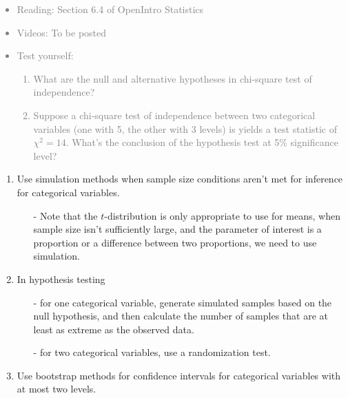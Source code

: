 \documentclass[11pt]{article}
\newcommand{\gray}[1]{\textcolor{gray}{#1}}
\begin{document}
\gray{
{\it
\vspace{-0.55cm}
\begin{itemize}
\renewcommand{\labelitemi}{{\textcolor{dark}{$\ast$}}}
\item Reading: Section 6.4 of OpenIntro Statistics
\item Videos: To be posted
\item Test yourself:
\begin{enumerate}
\item What are the null and alternative hypotheses in chi-square test of independence?
\item Suppose a chi-square test of independence between two categorical variables (one with 5, the other with 3 levels) is yields a test statistic of $\chi^2 = 14$. What's the conclusion of the hypothesis test at 5\% significance level?
\end{enumerate}
\end{itemize}
}}

%

\begin{enumerate}[resume]
\renewcommand\labelenumi{\textcolor{light}{\textbf{LO \theenumi.}}}

\item Use simulation methods when sample size conditions aren't met for inference for categorical variables.
\begin{itemize}
\item[-] Note that the $t$-distribution is only appropriate to use for means, when sample size isn't sufficiently large, and the parameter of interest is a proportion or a difference between two proportions, we need to use simulation.
\end{itemize}

\item In hypothesis testing
\begin{itemize}
\item[-] for one categorical variable, generate simulated samples based on the null hypothesis, and then calculate the number of samples that are at least as extreme as the observed data.
\item[-] for two categorical variables, use a randomization test.
\end{itemize}

\item Use bootstrap methods for confidence intervals for categorical variables with at most two levels. 

\end{enumerate}
\end{document}
